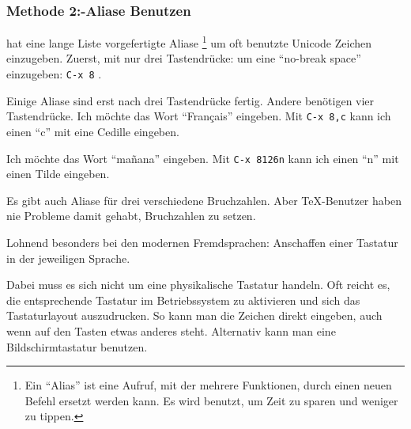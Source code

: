 \subsubsection*{Methode 2:\enspace {}-Aliase Benutzen}
 hat eine lange Liste vorgefertigte Aliase%
\footnote{Ein \enquote{Alias} ist eine Aufruf, mit der
mehrere Funktionen, durch einen neuen Befehl ersetzt werden kann.
Es wird benutzt, um Zeit zu sparen und weniger zu tippen.}%
um oft benutzte Unicode Zeichen einzugeben. Zuerst, mit nur
drei Tastendrücke: um eine \enquote{no-break space} einzugeben: %
\texttt{C-x 8}
.

Einige Aliase sind erst nach drei Tastendrücke fertig. Andere
benötigen vier Tastendrücke. Ich möchte das Wort \enquote{Français}
eingeben. Mit %
\texttt{C-x 8}\texttt{,c}
kann ich einen \enquote{c} mit eine Cedille eingeben.

Ich möchte das Wort \enquote{mañana} eingeben. Mit %
\texttt{C-x 8}\texttt{\char126n}
kann ich einen \enquote{n} mit einen Tilde eingeben.

Es gibt auch Aliase für drei verschiedene Bruchzahlen. Aber
\TeX{}-Benutzer haben nie Probleme damit gehabt, Bruchzahlen
zu setzen.




Lohnend besonders bei den modernen Fremdsprachen: Anschaffen einer Tastatur in der jeweiligen
Sprache.

Dabei muss es sich nicht um eine physikalische Tastatur handeln.
Oft reicht es, die entsprechende Tastatur im Betriebssystem zu aktivieren und sich das
Tastaturlayout auszudrucken.
So kann man die Zeichen direkt eingeben, auch wenn auf den Tasten etwas anderes steht.
Alternativ kann man eine Bildschirmtastatur benutzen.

